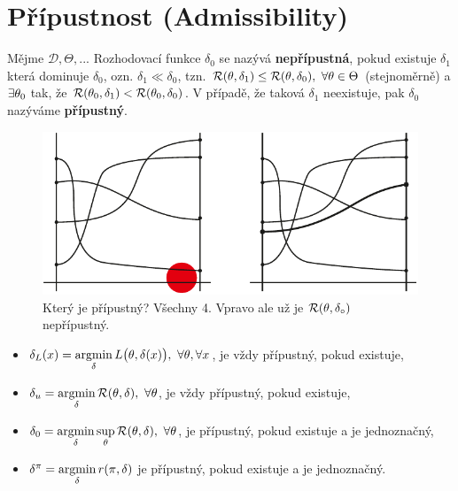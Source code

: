 \section{Přípustnost (Admissibility)}
\begin{define}
	Mějme $\mathscr{D},\Theta,...$ Rozhodovací funkce $\delta_0$ se nazývá \textbf{nepřípustná}, pokud existuje $\delta_1$ která dominuje $\delta_0$, ozn. $\delta_1\ll\delta_0$, tzn. $\mathcal{R}(\theta,\delta_1)\leq\mathcal{R}(\theta,\delta_0),~\forall\theta\in\Theta$ (stejnoměrně) a $\exists\theta_0$ tak, že $\mathcal{R}(\theta_0,\delta_1)<\mathcal{R}(\theta_0,\delta_0)$. V případě, že taková $\delta_1$ neexistuje, pak $\delta_0$ nazýváme \textbf{přípustný}.
	
	\begin{figure}[h]
		\centering
		\includegraphics[width=0.6\linewidth]{pictures/9_2-3.pdf}
		\caption{Který je přípustný? Všechny 4. Vpravo ale už je $\mathcal{R}(\theta,\delta_\circ)$ nepřípustný.}
		\label{fig:92}
	\end{figure}
	
\end{define}
\begin{theorem}
	\begin{itemize}
		\item 
	$\delta_L(x)=\mathop{\mathrm{argmin}}\limits_\delta L\big(\theta,\delta(x)\big),~\forall\theta,\forall x$, je vždy přípustný, pokud existuje, \item  $\delta_u=\mathop{\mathrm{argmin}}\limits_\delta\mathcal{R}(\theta,\delta),~\forall\theta$, je vždy přípustný, pokud existuje, \item  $\delta_0=\mathop{\mathrm{argmin}}\limits_\delta\sup\limits_\theta\mathcal{R}(\theta,\delta),~\forall\theta$, je přípustný, pokud existuje a je jednoznačný, \item  $\delta^\pi=\mathop{\mathrm{argmin}}\limits_\delta r(\pi,\delta)$ je přípustný, pokud existuje a je jednoznačný.
\end{itemize}
\end{theorem}



